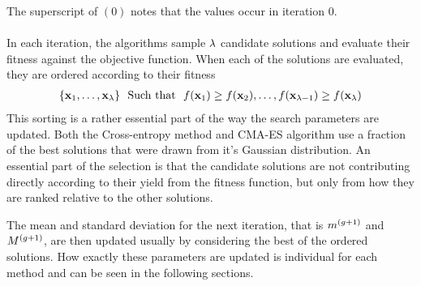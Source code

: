 The superscript of $(0)$ notes that the values occur in iteration 0.\\
\\
In each iteration, the algorithms sample $\lambda$ candidate solutions 
and evaluate their fitness
against the objective function. When each of the solutions are evaluated,
they are ordered according to their fitness
\begin{align}
\{\textbf{\individual }_{1}, \hdots, 
\textbf{\individual }_{\populationSize }\}\ \ \text{Such that}\ \ 
\fitnessFunction(\textbf{x}_1) \geq 
\fitnessFunction(\textbf{\individual }_2), \hdots, 
\fitnessFunction(\textbf{\individual }_{\populationSize  - 1}) \geq 
\fitnessFunction(\textbf{\individual }_{\populationSize })
\end{align}
This sorting is a rather essential part of the way the search parameters are
updated. Both the Cross-entropy method and CMA-ES algorithm use a fraction of the 
best solutions that were drawn from it's Gaussian distribution. An essential 
part of the selection is that the candidate solutions are not contributing
directly according to their yield from the fitness function, but only from 
how they are ranked relative to the other solutions. 

The mean and standard deviation for the next iteration, 
that is $m^{(g+1)}$ and $M^{(g+1)}$, are
then updated usually by considering the best of the ordered solutions. How exactly
these parameters are updated is individual for each method and can be seen in the following
sections.


